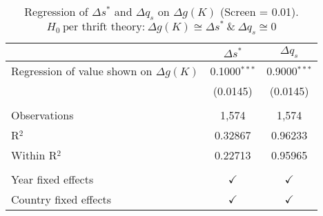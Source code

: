 \begin{table}[pos=h]
\caption{Regression of $\Delta s^*$ and $\Delta q_s$ on $\Delta g(K)$ (Screen = 0.01). $H_0\ \text{per thrift theory:} \ \Delta g(K) \cong \Delta s^* \ \& \ \Delta q_s \cong 0$}
\centering
\begin{tabularx}{\columnwidth}{lcc}
   \toprule
                                               & $\Delta s^*$   & $\Delta q_s$ \\    
   \midrule 
   Regression of value shown on $\Delta g(K)$  & 0.1000$^{***}$ & 0.9000$^{***}$\\   
                                               & (0.0145)       & (0.0145)\\   
    \\
   Observations                                & 1,574          & 1,574\\  
   R$^2$                                       & 0.32867        & 0.96233\\  
   Within R$^2$                                & 0.22713        & 0.95965\\  
    \\
   Year fixed effects                          & $\checkmark$   & $\checkmark$\\   
   Country fixed effects                       & $\checkmark$   & $\checkmark$\\   
   \bottomrule
\end{tabularx}
   \label{tbl-wid_si_table}
\end{table}